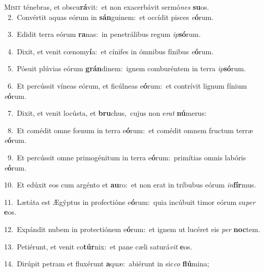 \lettrine{\initial\textcolor{\initialcolor}{M}}{isit} ténebras, et obscu\-\textbf{rá}\-vit:~\star et non exacerbávit sermó\textit{nes} \textbf{su}\-os.\\
{\numbfont\textcolor{\numbcolor}{~2.}}~Convértit aquas eórum in \textbf{sán}\-guinem:~\star et occídit pisces \textit{e}\-\textbf{ó}rum.\par
{\numbfont\textcolor{\numbcolor}{~3.}}~Edidit terra eórum \textbf{ra}\-nas:~\star in penetrálibus regum \textit{ip}\-\textbf{só}rum.\par
{\numbfont\textcolor{\numbcolor}{~4.}}~Dixit, et venit cœnomy\-\textbf{í}\-a:~\star et cínifes in ómnibus fínibus \textit{e}\-\textbf{ó}rum.\par
{\numbfont\textcolor{\numbcolor}{~5.}}~Pósuit plúvias eórum \textbf{grán}\-dinem:~\star ignem comburéntem in terra \textit{ip}\-\textbf{só}rum.\par
{\numbfont\textcolor{\numbcolor}{~6.}}~Et percússit víneas eórum, et ficúlneas e\-\textbf{ó}\-rum:~\star et contrívit lignum fínium \textit{e}\-\textbf{ó}rum.\par
{\numbfont\textcolor{\numbcolor}{~7.}}~Dixit, et venit locústa, et \textbf{bru}\-chus,~\star cujus non e\textit{rat} \textbf{nú}\-merus:\par
{\numbfont\textcolor{\numbcolor}{~8.}}~Et comédit omne fœnum in terra e\-\textbf{ó}\-rum:~\star et comédit omnem fructum terræ \textit{e}\-\textbf{ó}rum.\par
{\numbfont\textcolor{\numbcolor}{~9.}}~Et percússit omne primogénitum in terra e\-\textbf{ó}\-rum:~\star primítias omnis labóris \textit{e}\-\textbf{ó}rum.\par
{\numbfont\textcolor{\numbcolor}{10.}}~Et edúxit eos cum argénto et \textbf{au}\-ro:~\star et non erat in tríbubus eórum \textit{in}\-\textbf{fír}mus.\par
{\numbfont\textcolor{\numbcolor}{11.}}~Lætáta est Ægýptus in profectióne e\-\textbf{ó}\-rum:~\star quia incúbuit timor eórum su\textit{per} \textbf{e}\-os.\par
{\numbfont\textcolor{\numbcolor}{12.}}~Expándit nubem in protectiónem e\-\textbf{ó}\-rum:~\star et ignem ut lucéret eis \textit{per} \textbf{noc}\-tem.\par
{\numbfont\textcolor{\numbcolor}{13.}}~Petiérunt, et venit co\-\textbf{túr}\-nix:~\star et pane cæli saturá\textit{vit} \textbf{e}\-os.\par
{\numbfont\textcolor{\numbcolor}{14.}}~Dirúpit petram et fluxérunt \textbf{a}\-quæ:~\star abiérunt in sic\textit{co} \textbf{flú}\-mina;\par
